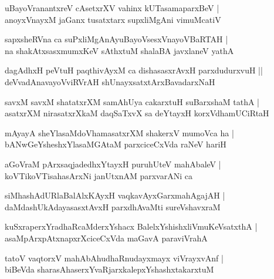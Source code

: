 \documentclass[twoside,12pt,openright]{book}
\newcounter{shloka}[chapter]
\begin{document}
\begin{shloka}%
uBayoVranantxreV cAsetxrXV vahinx kUTasamaparxBeV |\\
anoyxVnayxM jaGanx tusatxtarx supxliMgAni vimuMcatiV 
\end{shloka}

\begin{shloka}%
sapxsheRVna ca suPxliMgAnAyuBayoVsesxVnayoVBaRTAH |\\
na shakAtxsasxmumxKeV sAthxtuM shalaBA javxlaneV yathA 
\end{shloka}

\begin{shloka}%
dagAdhxH peVtuH paqthivAyxM ca dishasasxrAvxH parxdudurxvuH ||\\
deVvadAnavayoVviRVrAH shUnayxsatxtArxBavadarxNaH 
\end{shloka}

\begin{shloka}%
savxM savxM shatatxrXM samAhUya cakarxtuH suBarxshaM tathA |\\
asatxrXM nirasatxrXkaM daqSaTxvX sa deYtayxH korxVdhamUCiRtaH 
\end{shloka}

\begin{shloka}%
mAyayA sheYlasaMdoVhamasatxrXM shakerxV mumoVca ha |\\
bANwGeYsheshxYlasaMGAtaM parxciceCxVda raNeV hariH 
\end{shloka}

\begin{shloka}%
aGoVraM pArxsaqjadedhxYtayxH puruhUteV mahAbaleV |\\
koVTikoVTisahasArxNi janUtxnAM parxvarANi ca 
\end{shloka}

\begin{shloka}%
siMhashAdURlaBalAlxKAyxH vaqkavAyxGarxmahAgajAH |\\
daMdashUkAdayasasxtAvxH parxdhAvaMti sureVshavxraM 
\end{shloka}

\begin{shloka}%
kuSxraperxYradhaRcaMderxYshacx BalelxYshishxliVmuKeVsatxthA |\\
asaMpArxpAtxnapxrXciceCxVda maGavA paraviVrahA 
\end{shloka}

\begin{shloka}%
tatoV vaqtorxV mahAbAhudhaRnudayxmayx viVrayxvAnf |\\
biBeVda sharasAhaserxYvaRjarxkalepxYshashxtakarxtuM 
\end{shloka}
\end{document}
